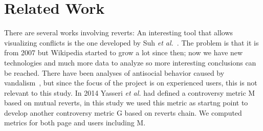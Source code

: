 \section{Related Work}
There are several works involving reverts: An interesting tool that allows visualizing conflicts is
the one developed by Suh \textit{et al.}~\cite{Suh2007}. The problem is that it is from 2007 but
Wikipedia started to grow a lot since then; now we have new technologies and much more data to
analyze so more interesting conclusions can be reached. There have been analyses of antisocial
behavior caused by vandalism~\cite{Kiesel2017}, but since the focus of the project is on experienced
users, this is not relevant to this study. In 2014 Yasseri \textit{et al.}\cite{Yasseri2014} had
defined a controversy metric M based on mutual reverts, in this study we used this metric as startng
point to develop another controversy metric G based on reverts chain. We computed metrics for both
page and users including M.